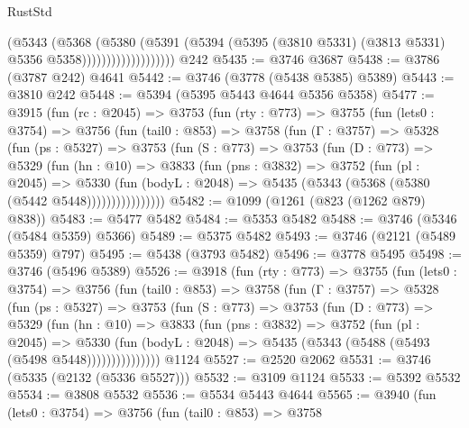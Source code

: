 \begin{lexlean}{RustStd}
\begin{coremodule}
                              (@5343
                                (@5368
                                  (@5380
                                    (@5391
                                      (@5394
                                        (@5395
                                          (@3810 @5331)
                                          (@3813 @5331)
                                          @5356
                                          @5358)))))))))))))))))))
    @242
@5435 := @3746 @3687
@5438 := @3786 (@3787 @242) @4641
@5442 := @3746 (@3778 (@5438 @5385) @5389)
@5443 := @3810 @242
@5448 := @5394 (@5395 @5443 @4644 @5356 @5358)
@5477 := @3915
    (fun (rc : @2045) =>
    @3753
      (fun (rty : @773) =>
      @3755
        (fun (lets0 : @3754) =>
        @3756
          (fun (tail0 : @853) =>
          @3758
            (fun (Γ : @3757) =>
            @5328
              (fun (ps : @5327) =>
              @3753
                (fun (S : @773) =>
                @3753
                  (fun (D : @773) =>
                  @5329
                    (fun (hn : @10) =>
                    @3833
                      (fun (pns : @3832) =>
                      @3752
                        (fun (pl : @2045) =>
                        @5330
                          (fun (bodyL : @2048) =>
                          @5435 (@5343 (@5368 (@5380 (@5442 @5448))))))))))))))))
@5482 := @1099 (@1261 (@823 (@1262 @879) @838))
@5483 := @5477 @5482
@5484 := @5353 @5482
@5488 := @3746 (@5346 (@5484 @5359) @5366)
@5489 := @5375 @5482
@5493 := @3746 (@2121 (@5489 @5359) @797)
@5495 := @5438 (@3793 @5482)
@5496 := @3778 @5495
@5498 := @3746 (@5496 @5389)
@5526 := @3918
    (fun (rty : @773) =>
    @3755
      (fun (lets0 : @3754) =>
      @3756
        (fun (tail0 : @853) =>
        @3758
          (fun (Γ : @3757) =>
          @5328
            (fun (ps : @5327) =>
            @3753
              (fun (S : @773) =>
              @3753
                (fun (D : @773) =>
                @5329
                  (fun (hn : @10) =>
                  @3833
                    (fun (pns : @3832) =>
                    @3752
                      (fun (pl : @2045) =>
                      @5330
                        (fun (bodyL : @2048) =>
                        @5435 (@5343 (@5488 (@5493 (@5498 @5448)))))))))))))))
    @1124
@5527 := @2520 @2062
@5531 := @3746 (@5335 (@2132 (@5336 @5527)))
@5532 := @3109 @1124
@5533 := @5392 @5532
@5534 := @3808 @5532
@5536 := @5534 @5443 @4644
@5565 := @3940
    (fun (lets0 : @3754) =>
    @3756
      (fun (tail0 : @853) =>
      @3758

\end{coremodule}
\end{lexlean}
